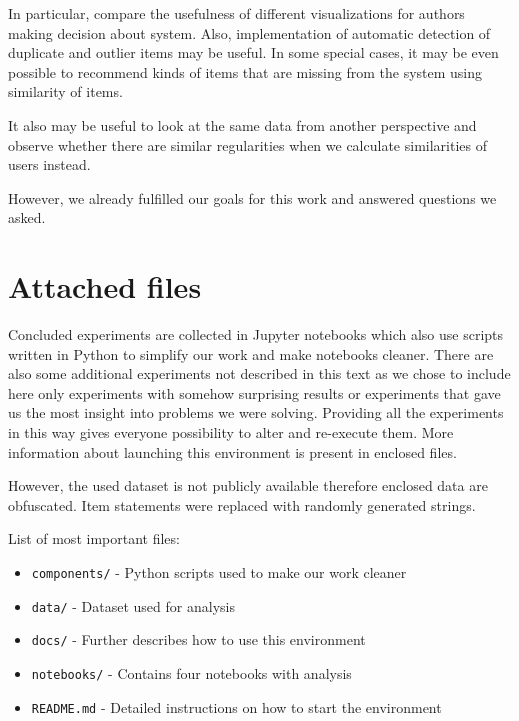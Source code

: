 \documentclass[
  printed, %
  table,   %
  nolof,     %
  nolot,     %
  color,
  final,
  nocover
]{fithesis3}
\begin{document}
In particular, compare the usefulness of different visualizations for authors making decision about system. Also, implementation of automatic detection of duplicate and outlier items may be useful. In some special cases, it may be even possible to recommend kinds of items that are missing from the system using similarity of items.

It also may be useful to look at the same data from another perspective and observe whether there are similar regularities when we calculate similarities of users instead.


However, we already fulfilled our goals for this work and answered questions we asked.


\makeatletter\thesis@blocks@clear\makeatother

\appendix %


\chapter{Attached files}

Concluded experiments are collected in Jupyter notebooks which also use scripts written in Python to simplify our work and make notebooks cleaner. There are also some additional experiments not described in this text as we chose to include here only experiments with somehow surprising results or experiments that gave us the most insight into problems we were solving. Providing all the experiments in this way gives everyone possibility to alter and re-execute them. More information about launching this environment is present in enclosed files.

However, the used dataset is not publicly available therefore enclosed data are obfuscated. Item statements were replaced with randomly generated strings.

List of most important files:

\begin{itemize}[\null]
\item \texttt{components/} - Python scripts used to make our work cleaner
\item \texttt{data/} - Dataset used for analysis
\item \texttt{docs/} - Further describes how to use this environment
\item \texttt{notebooks/} - Contains four notebooks with analysis
\item \texttt{README.md} - Detailed instructions on how to start the environment
\end{itemize}
\end{document}

